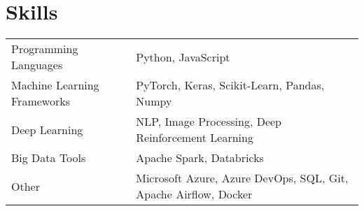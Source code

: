 \documentclass[a4paper,10pt]{article}
\begin{document}
\section{Skills}
\begin{tabularx}{\linewidth}{@{}l X@{}}
Programming Languages & Python, JavaScript\\
Machine Learning Frameworks & PyTorch, Keras, Scikit-Learn, Pandas, Numpy\\
Deep Learning & NLP, Image Processing, Deep Reinforcement Learning\\
Big Data Tools & Apache Spark, Databricks\\
Other & Microsoft Azure, Azure DevOps, SQL, Git, Apache Airflow, Docker\\
\end{tabularx}





\vfill
{}
\end{document}
